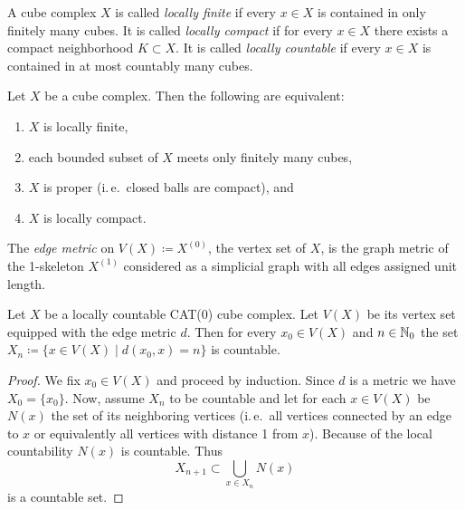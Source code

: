 \begin{defin}
  A cube complex \(X\) is called \emph{locally finite} if every \(x \in X\) is contained in only finitely many cubes. It is called \emph{locally compact} if for every \(x \in X\) there exists a compact neighborhood \(K \subset X\). It is called \emph{locally countable} if every \(x \in X\) is contained in at most countably many cubes.
\end{defin}

\begin{prop}
  Let \(X\) be a cube complex. Then the following are equivalent:
  \begin{enumerate}
  \item \(X\) is locally finite,
  \item each bounded subset of \(X\) meets only finitely many cubes,
  \item \(X\) is proper (i.\,e.\ closed balls are compact), and
  \item \(X\) is locally compact.
  \end{enumerate}
\end{prop}

\begin{defin}
  \label{defin:edge-metric}
  The \emph{edge metric} on \(V(X) \coloneqq X^{(0)}\), the vertex set of \(X\), is the graph metric of the 1-skeleton \(X^{(1)}\) considered as a simplicial graph with all edges assigned unit length.
\end{defin}

\begin{lemma}
  \label{lem:lf-countable}
  Let \(X\) be a locally countable CAT(0) cube complex. Let \(V(X)\) be its vertex set equipped with the edge metric \(d\). Then for every \(x_0 \in V(X)\) and \(n \in \mathbb{N}_0\) the set \(X_n \coloneqq \{x \in V(X) \mid d(x_0, x) = n\}\) is countable.
\end{lemma}

\begin{proof}
  We fix \(x_0 \in V(X)\) and proceed by induction. Since \(d\) is a metric we have \(X_0 = \{x_0\}\). Now, assume \(X_n\) to be countable and let for each \(x \in V(X)\) be \(N(x)\) the set of its neighboring vertices (i.\,e.\ all vertices connected by an edge to \(x\) or equivalently all vertices with distance 1 from \(x\)). Because of the local countability \(N(x)\) is countable. Thus
  \[
    X_{n+1} \subset \bigcup_{x \in X_n} N(x)
  \]
  is a countable set.
\end{proof}

